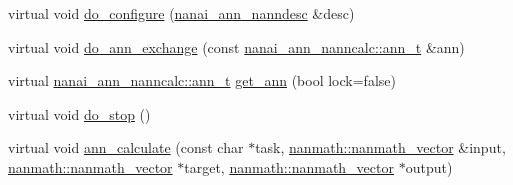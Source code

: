 \begin{DoxyCompactItemize}
\item 
virtual void \hyperlink{classnanai_1_1nanai__ann__nanncalc_ad76affc9e9819af44025704d424ce3ec}{do\+\_\+configure} (\hyperlink{namespacenanai_a892a8c80381d0005a076b68fbbf2d918}{nanai\+\_\+ann\+\_\+nanndesc} \&desc)
\item 
virtual void \hyperlink{classnanai_1_1nanai__ann__nanncalc_a3501b12051f6bb169b408a3671196f16}{do\+\_\+ann\+\_\+exchange} (const \hyperlink{classnanai_1_1nanai__ann__nanncalc_1_1ann__t}{nanai\+\_\+ann\+\_\+nanncalc\+::ann\+\_\+t} \&ann)
\item 
virtual \hyperlink{classnanai_1_1nanai__ann__nanncalc_1_1ann__t}{nanai\+\_\+ann\+\_\+nanncalc\+::ann\+\_\+t} \hyperlink{classnanai_1_1nanai__ann__nanncalc_aefda6586e9dd96625b2e2948baec8e18}{get\+\_\+ann} (bool lock=false)
\item 
virtual void \hyperlink{classnanai_1_1nanai__ann__nanncalc_a1973ea663b28bcc31a7297d75bae139e}{do\+\_\+stop} ()
\item 
virtual void \hyperlink{classnanai_1_1nanai__ann__nanncalc_aeebc06b5241f6f9e1e5b78daa7e31911}{ann\+\_\+calculate} (const char $\ast$task, \hyperlink{classnanmath_1_1nanmath__vector}{nanmath\+::nanmath\+\_\+vector} \&input, \hyperlink{classnanmath_1_1nanmath__vector}{nanmath\+::nanmath\+\_\+vector} $\ast$target, \hyperlink{classnanmath_1_1nanmath__vector}{nanmath\+::nanmath\+\_\+vector} $\ast$output)
\end{DoxyCompactItemize}
